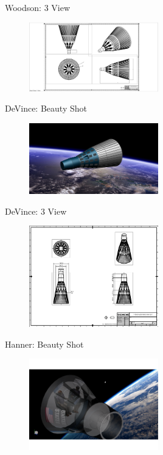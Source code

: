\documentclass[10pt]{beamer}
\begin{document}
	\begin{frame}{Woodson: 3 View}
\begin{figure}
	\centering
	\includegraphics[width=0.5\textwidth]{Woodson_3_View.png}
\end{figure}
\end{frame}

	\begin{frame}{DeVince: Beauty Shot}
\begin{figure}
	\centering
	\includegraphics[width=0.5\textwidth]{DeVince_Beauty.png}
\end{figure}
\end{frame}

\begin{frame}{DeVince: 3 View}
\begin{figure}
\centering
\includegraphics[width=0.5\textwidth]{DeVince_3_View.png}
\end{figure}
\end{frame}

	\begin{frame}{Hanner: Beauty Shot}
\begin{figure}
	\centering
	\includegraphics[width=0.5\textwidth]{Hanner_Beauty.png}
\end{figure}
\end{frame}
\end{document}
